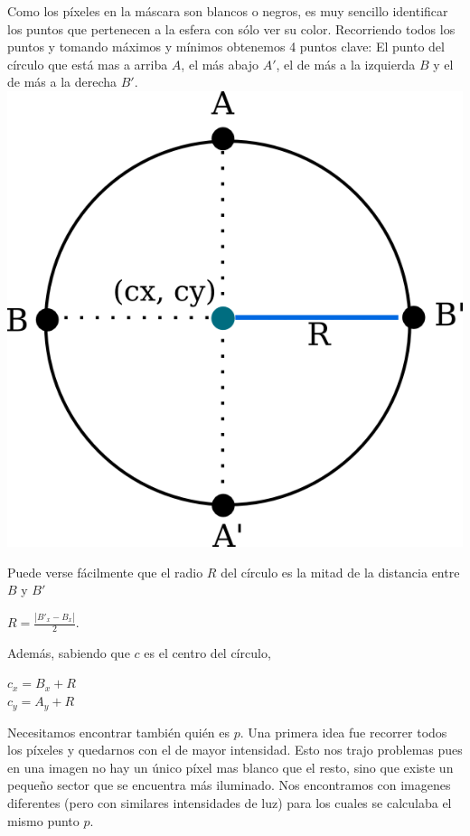 Como los píxeles en la máscara son blancos o negros, es muy sencillo identificar los puntos que pertenecen a la esfera con sólo ver su color. Recorriendo todos los puntos y tomando máximos y mínimos obtenemos 4 puntos clave: El punto del círculo que está mas a arriba $A$, el más abajo $A'$, el de más a la izquierda $B$ y el de más a la derecha $B'$. \\

{\centering
    \includegraphics[scale=0.5]{informe/imagenes/esfera/circulo.png} \\
}

Puede verse fácilmente que el radio $R$ del círculo es la mitad de la distancia entre $B$ y $B'$

\begin{center}
$R = \frac{|B'_x - B_x|}{2}$.
\end{center}

Además, sabiendo que $c$ es el centro del círculo,

\begin{center}
    $c_{x} = B_x + R$ \\
    $c_{y} = A_y + R$
\end{center}

Necesitamos encontrar también quién es $p$. Una primera idea fue recorrer todos los píxeles y quedarnos con el de mayor intensidad. Esto nos trajo problemas pues en una imagen no hay un único píxel mas blanco que el resto, sino que existe un pequeño sector que se encuentra más iluminado. Nos encontramos con imagenes diferentes (pero con similares intensidades de luz) para los cuales se calculaba el mismo punto $p$. \\

